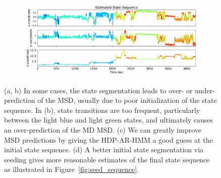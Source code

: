 \documentclass{article}
\begin{document}
\begin{figure}
\begin{subfigure}{0.35\textwidth}
  \caption{}\label{fig:msd_improvement}
  \end{subfigure}
  \begin{subfigure}{0.63\textwidth}
  \includegraphics[width=\textwidth]{state_sequence_after_ACH_21.pdf}
  \caption{}\label{fig:state_sequence_after}
  \end{subfigure}
  \caption{(a, b) In some cases, the state segmentation leads to over- or 
  under-prediction of the MSD, usually due to poor initialization of the state
  sequence. In (b), state transitions are too frequent, particularly between 
  the light blue and light green states, and ultimately causes an over-prediction
  of the MD MSD. (c) We can greatly improve MSD predictions by giving the HDP-AR-HMM a good
  guess at the initial state sequence. (d) A better initial state segmentation
  via seeding gives more reasonable estimates of the final state sequence
  as illustrated in Figure~\ref{fig:seed_sequence}.}\label{fig:improvement_state_sequence}
  \end{figure}
\end{document}
